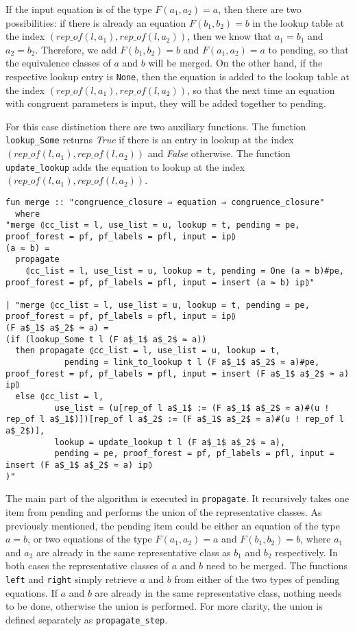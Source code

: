 If the input equation is of the type $F(a_1, a_2) = a$, then there are two possibilities: if there is already an equation $F(b_1, b_2) = b$ in the lookup table at the index $(rep\_of(l,a_1), rep\_of(l,a_2))$, then we know that $a_1 = b_1$ and $a_2 = b_2$. Therefore, we add $F(b_1, b_2) = b$ and $F(a_1, a_2) = a$ to pending, so that the equivalence classes of $a$ and $b$ will be merged.
On the other hand, if the respective lookup entry is \lstinline{None}, then the equation is added to the lookup table at the index $(rep\_of(l,a_1), rep\_of(l,a_2))$, so that the next time an equation with congruent parameters is input, they will be added together to pending.

For this case distinction there are two auxiliary functions.
The function \lstinline{lookup_Some} returns \emph{True} if there is an entry in lookup at the index $(rep\_of(l,a_1), rep\_of(l,a_2))$ and \emph{False} otherwise. The function \lstinline{update_lookup} adds the equation to lookup at the index $(rep\_of(l,a_1), rep\_of(l,a_2))$.

\begin{lstlisting}
fun merge :: "congruence_closure ⇒ equation ⇒ congruence_closure"
  where
"merge ⦇cc_list = l, use_list = u, lookup = t, pending = pe, proof_forest = pf, pf_labels = pfl, input = ip⦈
(a ≈ b) =
  propagate
    ⦇cc_list = l, use_list = u, lookup = t, pending = One (a ≈ b)#pe, proof_forest = pf, pf_labels = pfl, input = insert (a ≈ b) ip⦈"

| "merge ⦇cc_list = l, use_list = u, lookup = t, pending = pe, proof_forest = pf, pf_labels = pfl, input = ip⦈
(F a$_1$ a$_2$ ≈ a) =
(if (lookup_Some t l (F a$_1$ a$_2$ ≈ a))
  then propagate ⦇cc_list = l, use_list = u, lookup = t,
            pending = link_to_lookup t l (F a$_1$ a$_2$ ≈ a)#pe, proof_forest = pf, pf_labels = pfl, input = insert (F a$_1$ a$_2$ ≈ a) ip⦈
  else ⦇cc_list = l,
          use_list = (u[rep_of l a$_1$ := (F a$_1$ a$_2$ ≈ a)#(u ! rep_of l a$_1$)])[rep_of l a$_2$ := (F a$_1$ a$_2$ ≈ a)#(u ! rep_of l a$_2$)],
          lookup = update_lookup t l (F a$_1$ a$_2$ ≈ a),
          pending = pe, proof_forest = pf, pf_labels = pfl, input = insert (F a$_1$ a$_2$ ≈ a) ip⦈
)"
\end{lstlisting}

The main part of the algorithm is executed in \lstinline{propagate}. It recursively takes one item from pending and performs the union of the representative classes. As previously mentioned, the pending item could be either an equation of the type $a = b$, or two equations of the type $F(a_1, a_2) = a$ and $F(b_1, b_2) = b$, where $a_1$ and $a_2$ are already in the same representative class as $b_1$ and $b_2$ respectively. In both cases the representative classes of $a$ and $b$ need to be merged. The functions \lstinline{left} and \lstinline{right} simply retrieve $a$ and $b$ from either of the two types of pending equations. If $a$ and $b$ are already in the same representative class, nothing needs to be done, otherwise the union is performed. For more clarity, the union is defined separately as \lstinline{propagate_step}.

